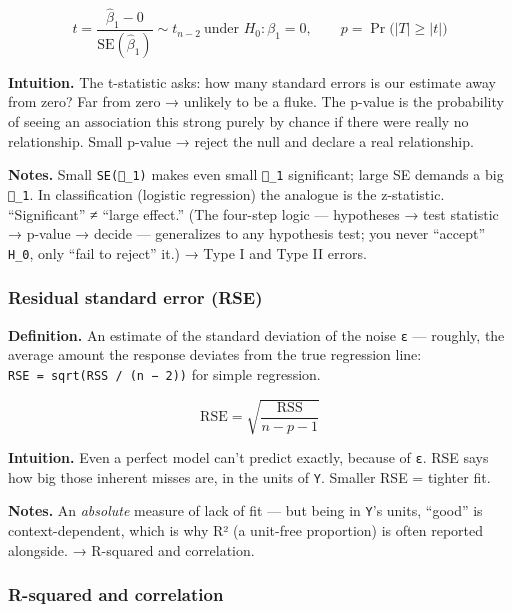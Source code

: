 \documentclass[
  10pt,
  letterpaper,
  onecolumn]{article}
\begin{document}
\begin{equation*}
t=\frac{\hat\beta_1-0}{\mathrm{SE}(\hat\beta_1)}\sim t_{n-2}\ \text{under }H_0:\beta_1=0,
\qquad
p=\Pr\bigl(|T|\ge|t|\bigr)
\end{equation*}

\textbf{Intuition.} The t-statistic asks: how many standard errors is
our estimate away from zero? Far from zero → unlikely to be a fluke. The
p-value is the probability of seeing an association this strong purely
by chance if there were really no relationship. Small p-value → reject
the null and declare a real relationship.

\textbf{Notes.} Small \texttt{SE(\_1)} makes even small \texttt{\_1}
significant; large SE demands a big \texttt{\_1}. In classification
(logistic regression) the analogue is the z-statistic. ``Significant'' ≠
``large effect.'' (The four-step logic --- hypotheses → test statistic →
p-value → decide --- generalizes to any hypothesis test; you never
``accept'' \texttt{H\_0}, only ``fail to reject'' it.) → Type I and Type
II errors.

\hypertarget{residual-standard-error-rse}{%
\subsubsection{Residual standard error
(RSE)}\label{residual-standard-error-rse}}

\textbf{Definition.} An estimate of the standard deviation of the noise
\texttt{ε} --- roughly, the average amount the response deviates from
the true regression line: \texttt{RSE\ =\ sqrt(RSS\ /\ (n\ −\ 2))} for
simple regression.

\begin{equation*}
\mathrm{RSE}=\sqrt{\frac{\mathrm{RSS}}{n-p-1}}
\end{equation*}

\textbf{Intuition.} Even a perfect model can't predict exactly, because
of \texttt{ε}. RSE says how big those inherent misses are, in the units
of \texttt{Y}. Smaller RSE = tighter fit.

\textbf{Notes.} An \emph{absolute} measure of lack of fit --- but being
in \texttt{Y}'s units, ``good'' is context-dependent, which is why R² (a
unit-free proportion) is often reported alongside. → R-squared and
correlation.

\hypertarget{r-squared-and-correlation}{%
\subsubsection{R-squared and
correlation}\label{r-squared-and-correlation}}
\end{document}
